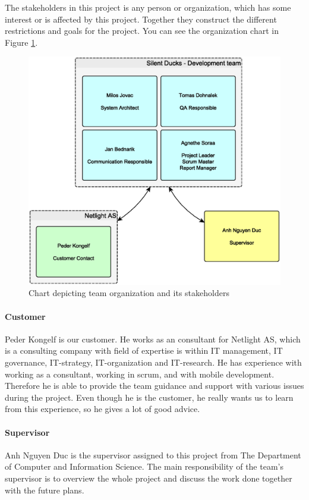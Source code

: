 The stakeholders in this project is any person or organization, which has some interest or is affected by this project. Together they construct the different restrictions and goals for the project. 
You can see the organization chart in Figure \ref{img:organization_chart}.

\begin{figure}[!ht]
    \begin{center}
    \includegraphics[width=12cm]{images/organization_chart.eps}
    \caption[Oganization chart]{Chart depicting team organization and its stakeholders}
    \label{img:organization_chart}
    \end{center}
\end{figure}

\paragraph{Customer}
Peder Kongelf is our customer. He works as an consultant for Netlight AS, which is a consulting company with field of expertise is within IT management, IT governance, IT-strategy, IT-organization and IT-research. He has experience with working as a consultant, working in scrum,  and with mobile development. Therefore he is able to provide the team guidance and support with various issues during the project. Even though he is the customer, he really wants us to learn from this experience, so he gives a lot of good advice.      


\paragraph{Supervisor}
Anh Nguyen Duc is the supervisor assigned to this project from The Department of Computer and Information Science. 
The main responsibility of the team's supervisor is to overview the whole project and discuss the work done together with the future plans. 

